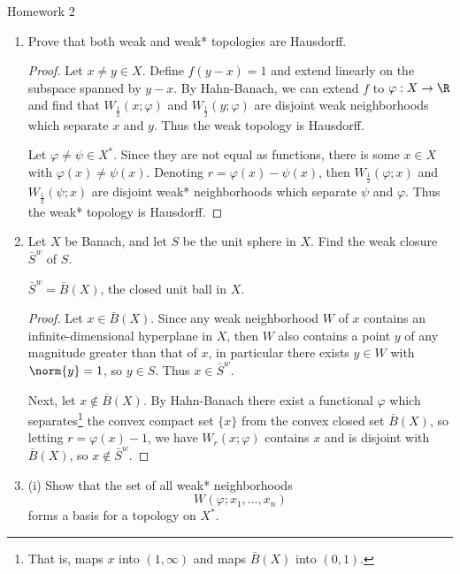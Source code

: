 \documentclass[12pt,letterpaper]{article}
\renewcommand{\phi}{\varphi}
\renewcommand{\closure}{\bar}
\begin{document}
\pagestyle{fancy}
\begin{center}
{\Large Homework 2}%
\end{center}

\begin{enumerate}
\item Prove that both weak and weak* topologies are Hausdorff. 

\begin{proof}
Let $x\neq y\in X$. Define $f(y-x)=1$ and extend linearly on the subspace spanned by $y-x$. By Hahn-Banach, we can extend $f$ to $\phi:X\to\R$ and find that $W_\frac{1}{2}(x;\phi)$ and $W_\frac{1}{2}(y;\phi)$ are disjoint weak neighborhoods which separate $x$ and $y$. Thus the weak topology is Hausdorff. \qedwhite

Let $\phi\neq\psi\in X^*$. Since they are not equal as functions, there is some $x\in X$ with $\phi(x)\neq\psi(x)$. Denoting $r=\phi(x)-\psi(x)$, then $W_\frac{1}{2}(\phi;x)$ and $W_\frac{1}{2}(\psi;x)$ are disjoint weak* neighborhoods which separate $\psi$ and $\phi$. Thus the weak* topology is Hausdorff.
\end{proof}

\renewcommand{\B}{\closure{B}(X)}
\item Let $X$ be Banach, and let $S$ be the unit sphere in $X$. Find the weak closure $\closure{S}^w$ of $S$. 

\answer $\closure{S}^w=\B$, the closed unit ball in $X$.

\renewcommand{\S}{\closure{S}^w}
\begin{proof}
Let $x\in \B$. Since any weak neighborhood $W$ of $x$ contains an infinite-dimensional hyperplane in $X$, then $W$ also contains a point $y$ of any magnitude greater than that of $x$, in particular there exists $y\in W$ with $\norm{y}=1$, so $y\in S$. Thus $x\in \S$. 

Next, let $x\not \in \B$. By Hahn-Banach there exist a functional $\phi$ which separates\footnote{That is, maps $x$ into $(1,\infty)$ and maps $\B$ into $(0,1)$. } the convex compact set $\{x\}$ from the convex closed set $\B$, so letting $r=\phi(x)-1$, we have $W_r(x;\phi)$ contains $x$ and is disjoint with $\B$, so $x\not\in \S$. 
\end{proof}

\item (i) Show that the set of all weak* neighborhoods
$$W(\phi;x_1, \dots, x_n)$$
forms a basis for a topology on $X^*$. 


\end{enumerate}
\end{document}
